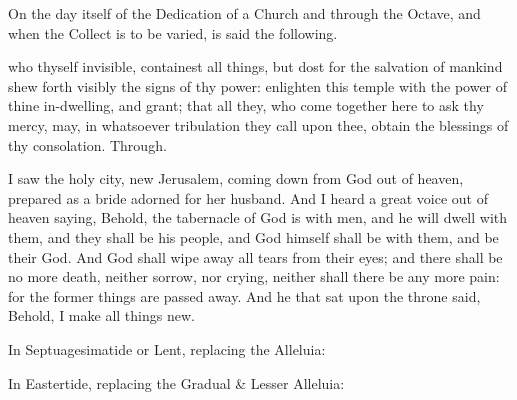 \begin{rubric}
	On the day itself of the Dedication of a Church and through the Octave, and when the Collect is to be varied, is said the following.
\end{rubric}
 who thyself invisible, containest all things, but dost for the salvation of mankind shew forth visibly the signs of thy power: enlighten this temple with the power of thine in-dwelling, and grant; that all they, who come together here to ask thy mercy, may, in whatsoever tribulation they call upon thee, obtain the blessings of thy consolation. Through.

 I saw the holy city, new Jerusalem, coming down from God out of heaven, prepared as a bride adorned for her husband. And I heard a great voice out of heaven saying, Behold, the tabernacle of God is with men, and he will dwell with them, and they shall be his people, and God himself shall be with them, and be their God. And God shall wipe away all tears from their eyes; and there shall be no more death, neither sorrow, nor crying, neither shall there be any more pain: for the former things are passed away. And he that sat upon the throne said, Behold, I make all things new. 


\begin{rubric}
{In Septuagesimatide or Lent, replacing the Alleluia:}
\end{rubric}

\vspace{-1ex}


\begin{rubric}
{In Eastertide, replacing the Gradual \& Lesser Alleluia:}
\end{rubric}

\vspace{-1ex}


